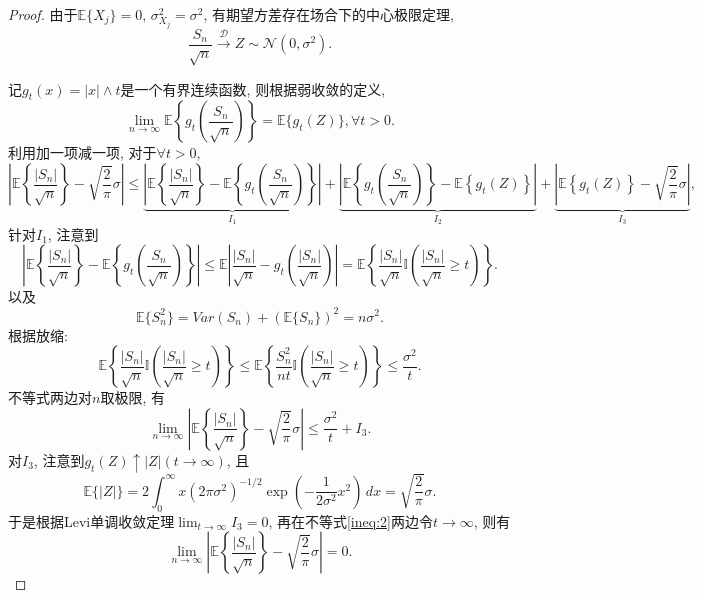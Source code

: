 \documentclass[UTF8, a4paper]{article}
\begin{document}
\begin{proof}



由于\(\mathbb{E}\{X_j\} = 0\), \(\sigma_{X_j}^2 = \sigma^2\), 有期望方差存在场合下的中心极限定理, 
$$
\frac{S_n}{ \sqrt{n}} \xrightarrow{\mathcal{D}} Z \sim \mathcal{N}(0, \sigma^2).
$$

记\(g_t(x) = |x|\land t\)是一个有界连续函数, 则根据弱收敛的定义, 
$$
\lim_{n\to\infty} \mathbb{E}\left\{g_t\left(\frac{S_n}{ \sqrt{n}}\right)\right\} = \mathbb{E}\{g_t(Z)\}, \forall t > 0.
$$
利用加一项减一项, 对于\(\forall t > 0\),
$$
\left|\mathbb{E}\left\{\frac{|S_n|}{ \sqrt{n}}\right\} - \sqrt{\frac{2}{\pi}} \sigma\right| \leq \underset{ I_1}{\underbrace{\left|\mathbb{E}\left\{\frac{|S_n|}{ \sqrt{n}}\right\} - \mathbb{E}\left\{g_t\left(\frac{S_n}{ \sqrt{n}}\right)\right\}\right|}} + \underset{I_2}{\underbrace{\left|\mathbb{E}\left\{g_t\left(\frac{S_n}{ \sqrt{n}}\right)\right\} - \mathbb{E}\left\{g_t\left(Z\right)\right\}\right|}} + \underset{I_3}{\underbrace{\left|\mathbb{E}\left\{g_t\left(Z\right)\right\} - \sqrt{\frac{2}{\pi}} \sigma\right|}},
$$
针对\(I_1\), 
注意到
$$
\left|\mathbb{E}\left\{\frac{|S_n|}{ \sqrt{n}}\right\} - \mathbb{E}\left\{g_t\left(\frac{S_n}{ \sqrt{n}}\right)\right\}\right| \leq \mathbb{E}\left|\frac{|S_n|}{\sqrt{n}} - g_t\left(\frac{|S_n|}{\sqrt{n}}\right)\right| = \mathbb{E}\left\{\frac{|S_n|}{\sqrt{n}} \mathbb{I}\left(\frac{|S_n|}{\sqrt{n}} \geq t\right)\right\}.
$$
以及 
$$
\mathbb{E}\{S_n^2\} = Var(S_n) + (\mathbb{E}\{S_n\})^2 = n\sigma^2.
$$
根据{\color{red}放缩}:
$$
\mathbb{E}\left\{\frac{|S_n|}{\sqrt{n}} \mathbb{I}\left(\frac{|S_n|}{\sqrt{n}} \geq t\right)\right\} \leq \mathbb{E}\left\{\frac{S_n^2}{nt} \mathbb{I}\left(\frac{|S_n|}{\sqrt{n}} \geq t\right)\right\} \leq \frac{\sigma^2}{t}.
$$
不等式两边对\(n\)取极限, 有 
\begin{equation}
    \lim_{n\to\infty}\left|\mathbb{E}\left\{\frac{|S_n|}{ \sqrt{n}}\right\} - \sqrt{\frac{2}{\pi}} \sigma\right|  \leq  \frac{\sigma^2}{t} + I_3. \label{ineq:2}
\end{equation}
对\(I_3\), 注意到\(g_t(Z) \uparrow |Z|(t\to \infty)\), 且 
$$
\mathbb{E}\{|Z|\} = 2 \int_{0}^{\infty} x (2\pi\sigma^2)^{-1/2} \exp\left(-\frac{1}{2\sigma^2} x^2\right)\, dx = \sqrt{\frac{2}{\pi}}\sigma.
$$
于是根据Levi单调收敛定理\(\lim_{t\to\infty} I_3 = 0\), 再在不等式\eqref{ineq:2}两边令\(t \to \infty\), 则有 
$$
\lim_{n\to\infty}\left|\mathbb{E}\left\{\frac{|S_n|}{ \sqrt{n}}\right\} - \sqrt{\frac{2}{\pi}} \sigma\right| = 0.
$$

\end{proof}
\end{document}
